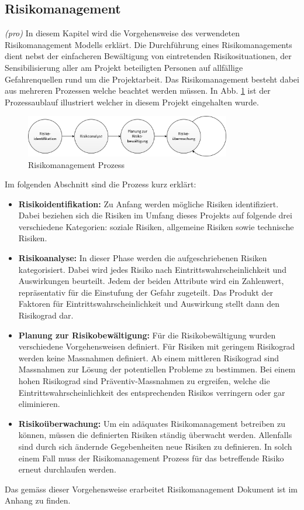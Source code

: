 \subsection{Risikomanagement}
\textit{(pro)} In diesem Kapitel wird die Vorgehensweise des verwendeten Risikomanagement Modells erklärt. Die Durchführung eines Risikomanagements dient nebst der einfacheren Bewältigung von eintretenden Risikosituationen, der Sensibilisierung aller am Projekt beteiligten Personen auf allfällige Gefahrenquellen rund um die Projektarbeit. Das Risikomanagement besteht dabei aus mehreren Prozessen welche beachtet werden müssen. In Abb. \ref{fig:Risikomanagement} ist der Prozessaublauf illustriert welcher in diesem Projekt eingehalten wurde.

\begin{figure}[H]
	\includegraphics[width=0.8\textwidth]{Illustrationen/2-Methodik/Risikomanagement.png}
	\caption{Risikomanagement Prozess}
	\label{fig:Risikomanagement}
\end{figure}

Im folgenden Abschnitt sind die Prozess kurz erklärt:

\begin{itemize}
	\item \textbf{Risikoidentifikation:} Zu Anfang werden mögliche Risiken identifiziert. Dabei beziehen sich die Risiken im Umfang dieses Projekts auf folgende drei verschiedene Kategorien: soziale Risiken, allgemeine Risiken sowie technische Risiken.
	\item \textbf{Risikoanalyse:} In dieser Phase werden die aufgeschriebenen Risiken kategorisiert. Dabei wird jedes Risiko nach Eintrittswahrscheinlichkeit und Auswirkungen beurteilt. Jedem der beiden Attribute wird ein Zahlenwert, repräsentativ für die Einstufung der Gefahr zugeteilt. Das Produkt der Faktoren für Eintrittswahrscheinlichkeit und Auswirkung stellt dann den Risikograd dar.
	\item \textbf{Planung zur Risikobewältigung:} Für die Risikobewältigung wurden verschiedene Vorgehensweisen definiert. Für Risiken mit geringem Risikograd werden keine Massnahmen definiert. Ab einem mittleren Risikograd sind Massnahmen zur Lösung der potentiellen Probleme zu bestimmen. Bei einem hohen Risikograd sind Präventiv-Massnahmen zu ergreifen, welche die Eintrittswahrscheinlichkeit des entsprechenden Risikos verringern oder gar eliminieren.
	\item \textbf{Risikoüberwachung:} Um ein adäquates Risikomanagement betreiben zu können, müssen die definierten Risiken ständig überwacht werden. Allenfalls sind durch sich ändernde Gegebenheiten neue Risiken zu definieren. In solch einem Fall muss der Risikomanagement Prozess für das betreffende Risiko erneut durchlaufen werden.
\end{itemize}

Das gemäss dieser Vorgehensweise erarbeitet Risikomanagement Dokument ist im Anhang zu finden.